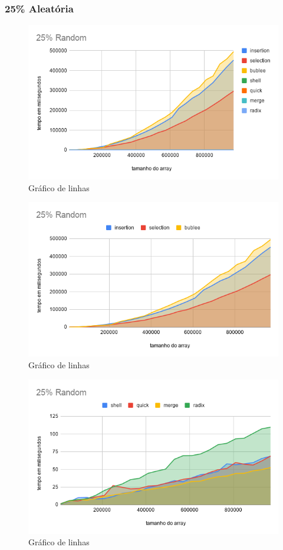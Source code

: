 \documentclass[a4paper, 12pt]{article}
\begin{document}
$  $ \\
\subsubsection{25\% Aleatória}
	\begin{figure}[!h]
	\caption{ Gráfico de linhas }
	\label{fig:25random1}
	\centering
	\includegraphics[width=1\textwidth, height=0.60\textwidth]{25Random}
	
\end{figure}
\begin{figure}[!h]
	\caption{ Gráfico de linhas }
	\label{fig:25random2}
	\centering
	\includegraphics[width=1\textwidth, height=0.57\textwidth]{25Random1}
\end{figure}

\begin{figure}[!h]
	\caption{ Gráfico de linhas }
	\label{fig:25random3}
	\centering
	\includegraphics[width=1\textwidth, height=0.57\textwidth]{25Random2}
\end{figure}
\end{document}

